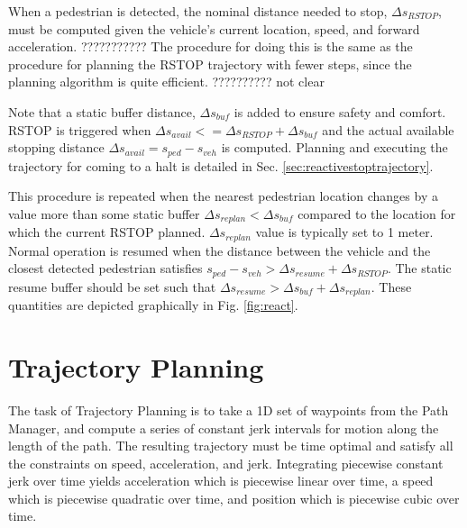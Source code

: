 \documentclass[letterpaper, 10 pt, conference]{ieeeconf}  %
\begin{document}
When a pedestrian is detected, the nominal distance needed to stop, $\Delta s_{RSTOP}$, must be computed given the vehicle's current location, speed, and forward acceleration.
??????????? The procedure for doing this is the same as the procedure for planning the RSTOP trajectory with fewer steps, since the planning algorithm is quite efficient. ?????????? not clear

Note that a static buffer distance, $\Delta s_{buf}$ is added to ensure safety and comfort.
RSTOP is triggered when $\Delta s_{avail} <= \Delta s_{RSTOP} + \Delta s_{buf}$ and the actual available stopping distance $\Delta s_{avail} = s_{ped} - s_{veh}$ is computed.
Planning and executing the trajectory for coming to a halt is detailed in Sec. \ref{sec:reactivestoptrajectory}.

This procedure is repeated when the nearest pedestrian location changes by a value more than some static buffer $\Delta s_{replan} < \Delta s_{buf}$ compared to the location for which the current RSTOP planned.
$\Delta s_{replan}$ value is typically set to 1 meter.
Normal operation is resumed when the distance between the vehicle and the closest detected pedestrian satisfies $s_{ped} - s_{veh} > \Delta s_{resume} + \Delta s_{RSTOP}$. The static resume buffer should be set such that $\Delta s_{resume} > \Delta s_{buf} + \Delta s_{replan}$.
These quantities are depicted graphically in Fig. \ref{fig:react}.


\section{Trajectory Planning} \label{sec:trajectoryplanning}

The task of Trajectory Planning is to take a 1D set of waypoints from the Path Manager, and compute a series of constant jerk intervals for motion along the length of the path.
The resulting trajectory must be time optimal and satisfy all the constraints on speed, acceleration, and jerk.
Integrating piecewise constant jerk over time yields acceleration which is piecewise linear over time, a speed which is piecewise quadratic over time, and position which is piecewise cubic over time.

\end{document}
